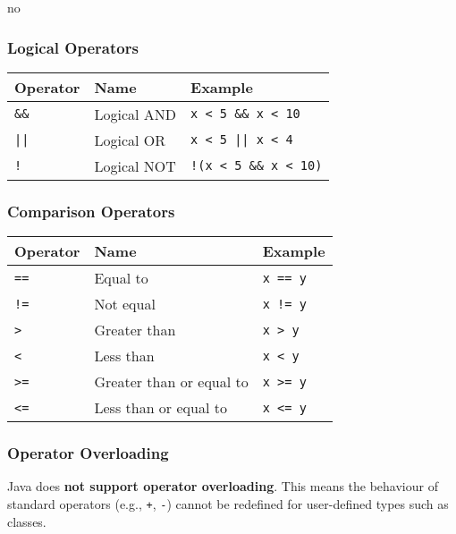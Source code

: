 no\documentclass{article}
\begin{document}
\vspace{1em}
\subsubsection{Logical Operators}
\begin{center}
\begin{tabular}{@{}lll@{}}
\toprule
\textbf{Operator} & \textbf{Name} & \textbf{Example} \\
\midrule
\texttt{\&\&} & Logical AND & \texttt{x < 5 \&\& x < 10} \\
\texttt{||}  & Logical OR  & \texttt{x < 5 || x < 4} \\
\texttt{!}   & Logical NOT & \texttt{!(x < 5 \&\& x < 10)} \\
\bottomrule
\end{tabular}
\end{center}

\vspace{1em}
\subsubsection{Comparison Operators}
\begin{center}
\begin{tabular}{@{}lll@{}}
\toprule
\textbf{Operator} & \textbf{Name} & \textbf{Example} \\
\midrule
\texttt{==} & Equal to                 & \texttt{x == y} \\
\texttt{!=} & Not equal                & \texttt{x != y} \\
\texttt{>}  & Greater than             & \texttt{x > y} \\
\texttt{<}  & Less than                & \texttt{x < y} \\
\texttt{>=} & Greater than or equal to & \texttt{x >= y} \\
\texttt{<=} & Less than or equal to    & \texttt{x <= y} \\
\bottomrule
\end{tabular}
\end{center}

\subsubsection{Operator Overloading}

Java does \textbf{not support operator overloading}. This means the behaviour of standard operators (e.g., \texttt{+}, \texttt{-}) cannot be redefined for user-defined types such as classes.
\end{document}
